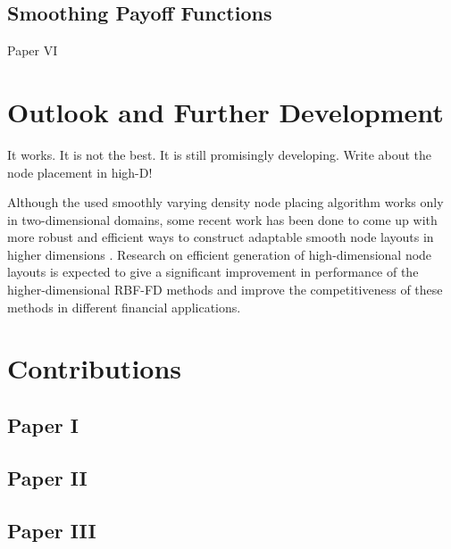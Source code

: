\documentclass{UUThesisTemplate}
\begin{document}
%
\section{Smoothing Payoff Functions}
Paper VI
%
%





%
\chapter{Outlook and Further Development}
\label{ch:outlook}
It works. It is not the best. It is still promisingly developing.
Write about the node placement in high-D!

\par 
Although the used smoothly varying density node placing algorithm works only in two-dimensional domains, some recent work has been done to come up with more robust and efficient ways to construct adaptable smooth node layouts in higher dimensions \cite{vlasiuk2017fast}. Research on efficient generation of high-dimensional node layouts is expected to give a significant improvement in performance of the higher-dimensional RBF-FD methods and improve the competitiveness of these methods in different financial applications.
\backmatter
    
    





%
\chapter{Contributions}





%
\section*{Paper I}





%
\section*{Paper II}





%
\section*{Paper III}
\end{document}
